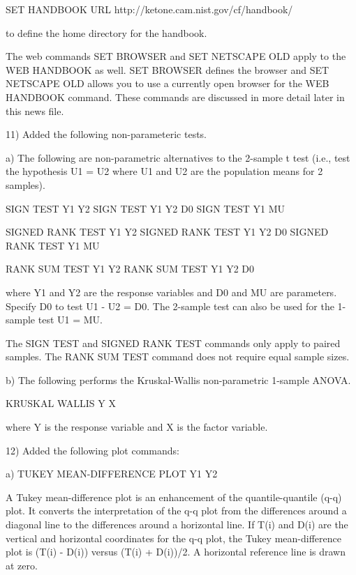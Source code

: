 {        SET HANDBOOK URL http://ketone.cam.nist.gov/cf/handbook/

    to define the home directory for the handbook.

    The web commands SET BROWSER and SET NETSCAPE OLD apply to
    the WEB HANDBOOK as well.  SET BROWSER defines the browser
    and SET NETSCAPE OLD allows you to use a currently open
    browser for the WEB HANDBOOK command.  These commands are
    discussed in more detail later in this news file.

11) Added the following non-parameteric tests.

    a) The following are non-parametric alternatives to the
       2-sample t test (i.e., test the hypothesis U1 = U2 where U1
       and U2 are the population means for 2 samples).

          SIGN TEST Y1 Y2
          SIGN TEST Y1 Y2 D0
          SIGN TEST Y1 MU

          SIGNED RANK TEST Y1 Y2
          SIGNED RANK TEST Y1 Y2 D0
          SIGNED RANK TEST Y1 MU

          RANK SUM TEST Y1 Y2
          RANK SUM TEST Y1 Y2 D0

       where Y1 and Y2 are the response variables and D0 and MU
       are parameters.  Specify D0 to test U1 - U2 = D0.  The
       2-sample test can also be used for the 1-sample test
       U1 = MU.

       The SIGN TEST and SIGNED RANK TEST commands only apply to
       paired samples.  The RANK SUM TEST command does not require
       equal sample sizes.

    b) The following performs the Kruskal-Wallis non-parametric
       1-sample ANOVA.

           KRUSKAL WALLIS Y X

       where Y is the response variable and X is the factor
       variable.

12) Added the following plot commands:

    a) TUKEY MEAN-DIFFERENCE PLOT Y1 Y2

       A Tukey mean-difference plot is an enhancement of the
       quantile-quantile (q-q) plot.  It converts the interpretation
       of the q-q plot from the differences around a diagonal line
       to the differences around a horizontal line.  If T(i) and
       D(i) are the vertical and horizontal coordinates for the q-q
       plot, the Tukey mean-difference plot is (T(i) - D(i)) versus
       (T(i) + D(i))/2.  A horizontal reference line is drawn at
       zero.

}
